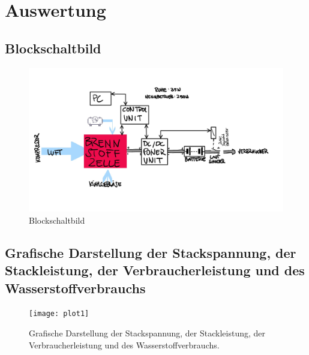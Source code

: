 \section{Auswertung}
\label{sec:Auswertung}


\subsection{Blockschaltbild}

\begin{figure}[H]
    \centering
    \includegraphics[width=\textwidth]{Abbildungen/Brennstoffzelle_Blockschaltbild.jpeg}
    \caption{Blockschaltbild}
    \label{fig:230628_Blockschaltbild}
\end{figure}


\subsection{Grafische Darstellung der Stackspannung, der
Stackleistung, der Verbraucherleistung und des Wasserstoffverbrauchs}
\begin{figure}[H]
    \centering
    \texttt{[image: plot1]}
    \caption{Grafische Darstellung der Stackspannung, der
    Stackleistung, der Verbraucherleistung und des Wasserstoffverbrauchs.}
    \label{fig:plot1_26062023}
  \end{figure}
